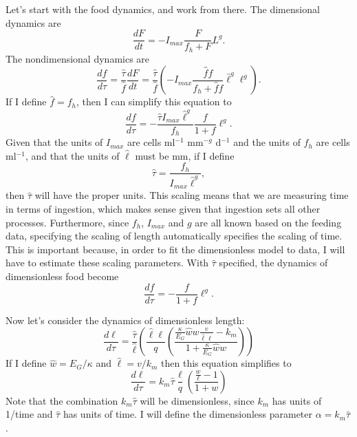 \documentclass[12pt,reqno,final,pdftex]{amsart}\usepackage[]{graphicx}\usepackage[]{color}
\theoremstyle{plain}
\numberwithin{equation}{part}
\begin{document}
Let's start with the food dynamics, and work from there.
The dimensional dynamics are
\begin{equation}
\frac{dF}{dt} = -I_{max}\frac{F}{f_h+F}L^g.
\end{equation}
The nondimensional dynamics are
\begin{equation}
\frac{df}{d\tau} = \frac{\hat{\tau}}{\hat{f}}\frac{dF}{dt}= \frac{\hat{\tau}}{\hat{f}}\left(-I_{max}\frac{\hat{f}f}{f_h + \hat{f}f}\hat{\ell}^g\ell^g\right).
\end{equation}
If I define $\hat{f} = f_h$, then I can simplify this equation to
\begin{equation}
\frac{df}{d\tau} = -\frac{\hat{\tau} I_{max} \hat{\ell}^g}{f_h} \frac{f}{1+f} \ell^g.
\end{equation}
Given that the units of $I_{max}$ are cells ml$^{-1}$ mm$^{-g}$ d$^{-1}$ and the units of $f_h$ are cells ml$^{-1}$, and that the units of $\hat{\ell}$ must be mm, if I define
\begin{equation*}
\hat{\tau} = \frac{f_h}{I_{max} \hat{\ell}^g},
\end{equation*}
then $\hat{\tau}$ will have the proper units.
This scaling means that we are measuring time in terms of ingestion, which makes sense given that ingestion sets all other processes.
Furthermore, since $f_h$, $I_{max}$ and $g$ are all known based on the feeding data, specifying the scaling of length automatically specifies the scaling of time.
This is important because, in order to fit the dimensionless model to data, I will have to estimate these scaling parameters.
With $\hat{\tau}$ specified, the dynamics of dimensionless food become
\begin{equation}
\frac{df}{d\tau} = -\frac{f}{1+f}\ell^g.
\end{equation}

Now let's consider the dynamics of dimensionless length:
\begin{equation*}
\frac{d\ell}{d\tau} = \frac{\hat{\tau}}{\hat{\ell}}\left(\frac{\hat{\ell}\ell}{q} \left(\frac{\frac{\kappa}{E_G}\hat{w}w\frac{v}{\hat{\ell}\ell}-k_m}{1+\frac{\kappa}{E_G}\hat{w}w} \right)\right)
\end{equation*}
If I define $\hat{w} = E_G/\kappa$ and $\hat{\ell} = v/k_m$ then this equation simplifies to
\begin{equation}
\frac{d\ell}{d\tau} = k_m \hat{\tau} \frac{\ell}{q}\left(\frac{\frac{w}{\ell}-1}{1+w}\right)
\end{equation}
Note that the combination $k_m \hat{\tau}$ will be dimensionless, since $k_m$ has units of 1/time and $\hat{\tau}$ has units of time.
I will define the dimensionless parameter $\alpha=k_m \hat{\tau}$.
\end{document}
